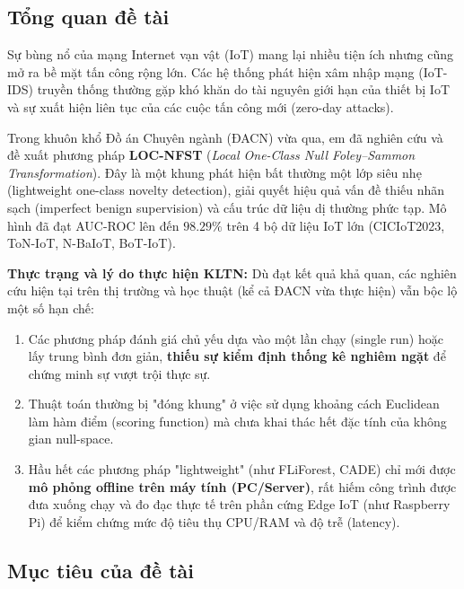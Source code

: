 \documentclass[12pt,a4paper]{article}
\begin{document}
\subsection{Tổng quan đề tài}

Sự bùng nổ của mạng Internet vạn vật (IoT) mang lại nhiều tiện ích nhưng cũng mở ra bề mặt tấn công rộng lớn. Các hệ thống phát hiện xâm nhập mạng (IoT-IDS) truyền thống thường gặp khó khăn do tài nguyên giới hạn của thiết bị IoT và sự xuất hiện liên tục của các cuộc tấn công mới (zero-day attacks). 

Trong khuôn khổ Đồ án Chuyên ngành (ĐACN) vừa qua, em đã nghiên cứu và đề xuất phương pháp \textbf{LOC-NFST} (\textit{Local One-Class Null Foley--Sammon Transformation}). Đây là một khung phát hiện bất thường một lớp siêu nhẹ (lightweight one-class novelty detection), giải quyết hiệu quả vấn đề thiếu nhãn sạch (imperfect benign supervision) và cấu trúc dữ liệu dị thường phức tạp. Mô hình đã đạt AUC-ROC lên đến $98.29\%$ trên 4 bộ dữ liệu IoT lớn (CICIoT2023, ToN-IoT, N-BaIoT, BoT-IoT).

\textbf{Thực trạng và lý do thực hiện KLTN:} Dù đạt kết quả khả quan, các nghiên cứu hiện tại trên thị trường và học thuật (kể cả ĐACN vừa thực hiện) vẫn bộc lộ một số hạn chế:
\begin{enumerate}[label=(\roman*)]
    \item Các phương pháp đánh giá chủ yếu dựa vào một lần chạy (single run) hoặc lấy trung bình đơn giản, \textbf{thiếu sự kiểm định thống kê nghiêm ngặt} để chứng minh sự vượt trội thực sự.
    \item Thuật toán thường bị "đóng khung" ở việc sử dụng khoảng cách Euclidean làm hàm điểm (scoring function) mà chưa khai thác hết đặc tính của không gian null-space.
    \item Hầu hết các phương pháp "lightweight" (như FLiForest, CADE) chỉ mới được \textbf{mô phỏng offline trên máy tính (PC/Server)}, rất hiếm công trình được đưa xuống chạy và đo đạc thực tế trên phần cứng Edge IoT (như Raspberry Pi) để kiểm chứng mức độ tiêu thụ CPU/RAM và độ trễ (latency).
\end{enumerate}

\subsection{Mục tiêu của đề tài}
\end{document}
